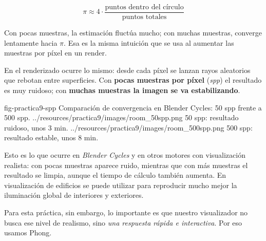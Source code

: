 \documentclass[
  spanish,
  11pt,
  a4paper,
  DIV=11,
  numbers=noendperiod]{scrartcl}
\begin{document}
\[
\pi \approx 4 \cdot \frac{\text{puntos dentro del círculo}}{\text{puntos totales}}
\]

Con pocas muestras, la estimación fluctúa mucho; con muchas muestras, converge lentamente hacia \(\pi\). Esa es la misma intuición que se usa al aumentar las muestras por píxel en un render.

En el renderizado ocurre lo mismo: desde cada píxel se lanzan rayos aleatorios que rebotan entre superficies. Con \textbf{pocas muestras por píxel} (\emph{spp}) el resultado es muy ruidoso; con \textbf{muchas muestras la imagen se va estabilizando}.

\PracticeImagePair
  {fig-practica9-spp}
  {Comparación de convergencia en Blender Cycles: 50 spp frente a 500 spp. }
  {../resources/practica9/images/room_50spp.png}
  {50 spp: resultado ruidoso, unos 3 min.}
  {../resources/practica9/images/room_500spp.png}
  {500 spp: resultado estable, unos 8 min.}

Esto es lo que ocurre en \emph{Blender Cycles} y en otros motores con visualización realista: con pocas muestras aparece ruido, mientras que con más muestras el resultado se limpia, aunque el tiempo de cálculo también aumenta. En visualización de edificios se puede utilizar para reproducir mucho mejor la iluminación global de interiores y exteriores.

Para esta práctica, sin embargo, lo importante es que nuestro visualizador no busca ese nivel de realismo, sino \emph{una respuesta rápida e interactiva}. Por eso usamos Phong.
\end{document}
